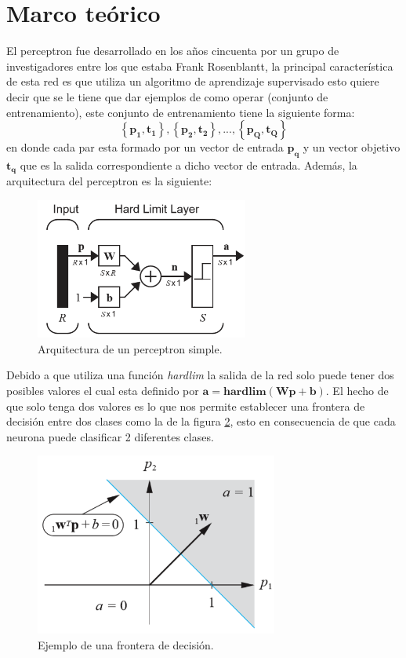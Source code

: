 \documentclass[12pt, titlepage]{article}
\begin{document}
    \section{Marco teórico}
    El perceptron fue desarrollado en los años cincuenta por un grupo de investigadores entre los que estaba Frank Rosenblantt, la principal característica de esta red es que utiliza un algoritmo de aprendizaje supervisado esto quiere decir que se le tiene que dar ejemplos de como operar (conjunto de entrenamiento), este conjunto de entrenamiento tiene la siguiente forma:
    \[ \left\lbrace \boldsymbol{p_1, t_1}\right\rbrace , \left\lbrace \boldsymbol{p_2, t_2}\right\rbrace , ... , \left\lbrace \boldsymbol{p_Q, t_Q}\right\rbrace  \]
    en donde cada par esta formado por un vector de entrada $\boldsymbol{p_q}$ y un vector objetivo $\boldsymbol{t_q}$ que es la salida correspondiente a dicho vector de entrada. \cite{libro1}
    Además, la arquitectura del perceptron es la siguiente:
    \begin{figure}[H]
        \begin{center}
            \includegraphics[width=7cm]{img/perceptron/perceptron.png}
            \caption{Arquitectura de un perceptron simple. \cite{libro1}}
            \label{fig:perpectron-diagrama}
        \end{center}
    \end{figure}
    Debido a que utiliza una función \emph{hardlim} la salida de la red solo puede tener dos posibles valores el cual esta definido por $\boldsymbol{a = hardlim(Wp+b)}$. El hecho de que solo tenga dos valores es lo que nos permite establecer una frontera de decisión entre dos clases como la de la figura \ref{fig:frontera}, esto en consecuencia de que cada neurona puede clasificar 2 diferentes clases.
    \begin{figure}[H]
        \begin{center}
            \includegraphics[width=8cm]{img/perceptron/frontera.png}
            \caption{Ejemplo de una frontera de decisión. \cite{libro1}}
            \label{fig:frontera}
        \end{center}
    \end{figure}
\end{document}
